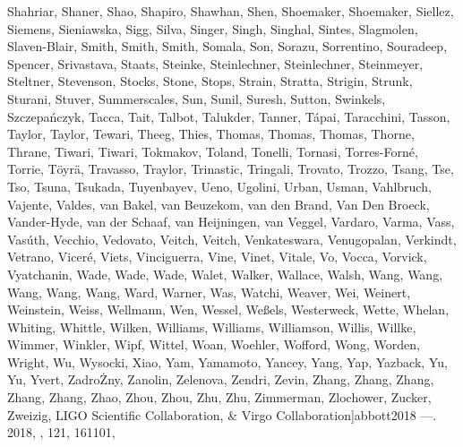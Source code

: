 \documentclass[times,tight]{aastex631}
\begin{document}
\begin{thebibliography}{}
{  {Shahriar}, {Shaner}, {Shao}, {Shapiro}, {Shawhan}, {Shen}, {Shoemaker},
  {Shoemaker}, {Siellez}, {Siemens}, {Sieniawska}, {Sigg}, {Silva}, {Singer},
  {Singh}, {Singhal}, {Sintes}, {Slagmolen}, {Slaven-Blair}, {Smith}, {Smith},
  {Smith}, {Somala}, {Son}, {Sorazu}, {Sorrentino}, {Souradeep}, {Spencer},
  {Srivastava}, {Staats}, {Steinke}, {Steinlechner}, {Steinlechner},
  {Steinmeyer}, {Steltner}, {Stevenson}, {Stocks}, {Stone}, {Stops}, {Strain},
  {Stratta}, {Strigin}, {Strunk}, {Sturani}, {Stuver}, {Summerscales}, {Sun},
  {Sunil}, {Suresh}, {Sutton}, {Swinkels}, {Szczepa{\'n}czyk}, {Tacca}, {Tait},
  {Talbot}, {Talukder}, {Tanner}, {T{\'a}pai}, {Taracchini}, {Tasson},
  {Taylor}, {Taylor}, {Tewari}, {Theeg}, {Thies}, {Thomas}, {Thomas}, {Thomas},
  {Thorne}, {Thrane}, {Tiwari}, {Tiwari}, {Tokmakov}, {Toland}, {Tonelli},
  {Tornasi}, {Torres-Forn{\'e}}, {Torrie}, {T{\"o}yr{\"a}}, {Travasso},
  {Traylor}, {Trinastic}, {Tringali}, {Trovato}, {Trozzo}, {Tsang}, {Tse},
  {Tso}, {Tsuna}, {Tsukada}, {Tuyenbayev}, {Ueno}, {Ugolini}, {Urban}, {Usman},
  {Vahlbruch}, {Vajente}, {Valdes}, {van Bakel}, {van Beuzekom}, {van den
  Brand}, {Van Den Broeck}, {Vander-Hyde}, {van der Schaaf}, {van Heijningen},
  {van Veggel}, {Vardaro}, {Varma}, {Vass}, {Vas{\'u}th}, {Vecchio},
  {Vedovato}, {Veitch}, {Veitch}, {Venkateswara}, {Venugopalan}, {Verkindt},
  {Vetrano}, {Vicer{\'e}}, {Viets}, {Vinciguerra}, {Vine}, {Vinet}, {Vitale},
  {Vo}, {Vocca}, {Vorvick}, {Vyatchanin}, {Wade}, {Wade}, {Wade}, {Walet},
  {Walker}, {Wallace}, {Walsh}, {Wang}, {Wang}, {Wang}, {Wang}, {Wang}, {Ward},
  {Warner}, {Was}, {Watchi}, {Weaver}, {Wei}, {Weinert}, {Weinstein}, {Weiss},
  {Wellmann}, {Wen}, {Wessel}, {We{\ss}els}, {Westerweck}, {Wette}, {Whelan},
  {Whiting}, {Whittle}, {Wilken}, {Williams}, {Williams}, {Williamson},
  {Willis}, {Willke}, {Wimmer}, {Winkler}, {Wipf}, {Wittel}, {Woan}, {Woehler},
  {Wofford}, {Wong}, {Worden}, {Wright}, {Wu}, {Wysocki}, {Xiao}, {Yam},
  {Yamamoto}, {Yancey}, {Yang}, {Yap}, {Yazback}, {Yu}, {Yu}, {Yvert},
  {Zadro{\.Z}ny}, {Zanolin}, {Zelenova}, {Zendri}, {Zevin}, {Zhang}, {Zhang},
  {Zhang}, {Zhang}, {Zhang}, {Zhao}, {Zhou}, {Zhou}, {Zhu}, {Zhu}, {Zimmerman},
  {Zlochower}, {Zucker}, {Zweizig}, {LIGO Scientific Collaboration}, \& {Virgo
  Collaboration}}]{abbott2018}
---. 2018, \prl, 121, 161101, 


\end{thebibliography}
\end{document}
